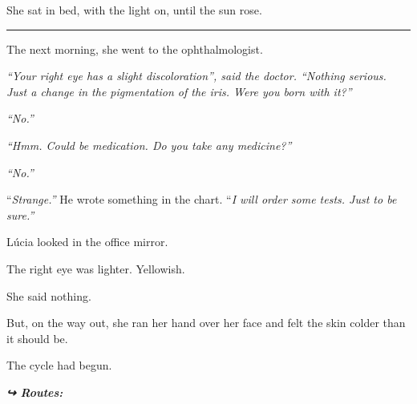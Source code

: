 \noindent She sat in bed, with the light on, until the sun rose.

\vspace{0.5em}\noindent\rule{\textwidth}{0.5pt}\vspace{0.5em}

\noindent The next morning, she went to the ophthalmologist.

\noindent \textit{\textquotedblleft{}Your right eye has a slight discoloration\textquotedblright{}\textit{, said the doctor. }\textquotedblleft{}Nothing serious. Just a change in the pigmentation of the iris. Were you born with it?\textquotedblright{}}

\noindent \textit{\textquotedblleft{}No.\textquotedblright{}}

\noindent \textit{\textquotedblleft{}Hmm. Could be medication. Do you take any medicine?\textquotedblright{}}

\noindent \textit{\textquotedblleft{}No.\textquotedblright{}}

\noindent \textquotedblleft{\textit{Strange.\textquotedblright{}} He wrote something in the chart. }\textquotedblleft{\textit{I will order some tests. Just to be sure.\textquotedblright{}}}

\noindent Lúcia looked in the office mirror.

\noindent The right eye was lighter.
Yellowish.

\noindent She said nothing.

\noindent But, on the way out, she ran her hand over her face and felt the skin colder than it should be.

\noindent The cycle had begun.

\vspace{0.5em}
\noindent\textit{\textbf{↪ Routes:}  \rotasep {}}
